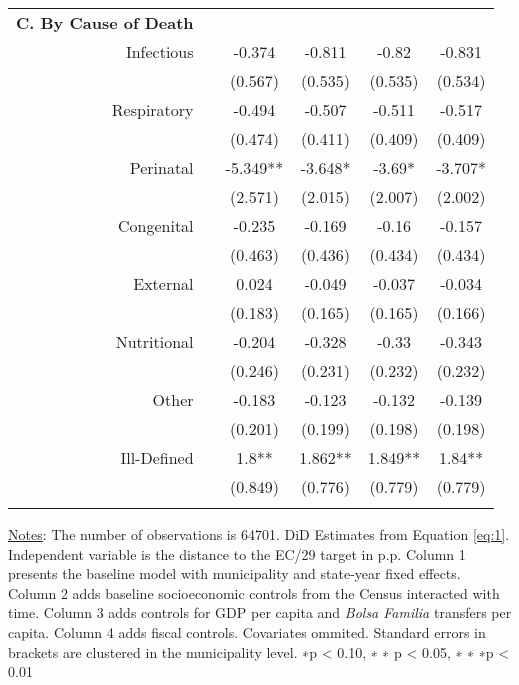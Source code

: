 \begin{table}[h!]
\begin{footnotesize}
\begin{center}
{\begin{threeparttable}[b]
\begin{tabular}{rrcccc}
          &       &       &       &       &  \\
    \midrule
    \multicolumn{1}{p{15.145em}}{\textbf{C. By Cause of Death}} &       &       &       &       &  \\
    \multicolumn{1}{p{15.145em}}{Infectious} &       & -0.374 & -0.811 & -0.82 & -0.831 \\
          &       & (0.567) & (0.535) & (0.535) & (0.534) \\
    \multicolumn{1}{p{15.145em}}{Respiratory} &       & -0.494 & -0.507 & -0.511 & -0.517 \\
          &       & (0.474) & (0.411) & (0.409) & (0.409) \\
    \multicolumn{1}{p{15.145em}}{Perinatal} &       & -5.349** & -3.648* & -3.69* & -3.707* \\
          &       & (2.571) & (2.015) & (2.007) & (2.002) \\
    \multicolumn{1}{p{15.145em}}{Congenital} &       & -0.235 & -0.169 & -0.16 & -0.157 \\
          &       & (0.463) & (0.436) & (0.434) & (0.434) \\
    \multicolumn{1}{p{15.145em}}{External} &       & 0.024 & -0.049 & -0.037 & -0.034 \\
          &       & (0.183) & (0.165) & (0.165) & (0.166) \\
    \multicolumn{1}{p{15.145em}}{Nutritional} &       & -0.204 & -0.328 & -0.33 & -0.343 \\
          &       & (0.246) & (0.231) & (0.232) & (0.232) \\
    \multicolumn{1}{p{15.145em}}{Other} &       & -0.183 & -0.123 & -0.132 & -0.139 \\
          &       & (0.201) & (0.199) & (0.198) & (0.198) \\
    \multicolumn{1}{p{15.145em}}{Ill-Defined} &       & 1.8** & 1.862** & 1.849** & 1.84** \\
          &       & (0.849) & (0.776) & (0.779) & (0.779) \\
          &       &       &       &       &  \\
    \bottomrule
    \bottomrule
    \end{tabular}%
    
    
    \begin{tablenotes}
  \scriptsize{\underline{Notes}: The number of observations is 64701. DiD Estimates from Equation \ref{eq:1}. Independent variable is the distance to the EC/29 target in p.p. Column 1 presents the baseline model with municipality and state-year fixed effects. Column 2 adds baseline socioeconomic controls from the Census interacted with time. Column 3 adds controls for GDP per capita and \emph{Bolsa Familia} transfers per capita. Column 4 adds fiscal controls. Covariates ommited. Standard errors in brackets are clustered in the municipality level. ∗p < 0.10, ∗ ∗ p < 0.05, ∗ ∗ ∗p < 0.01}
  \end{tablenotes}
    

\end{threeparttable}}
\end{center}
\end{footnotesize}
\end{table}
